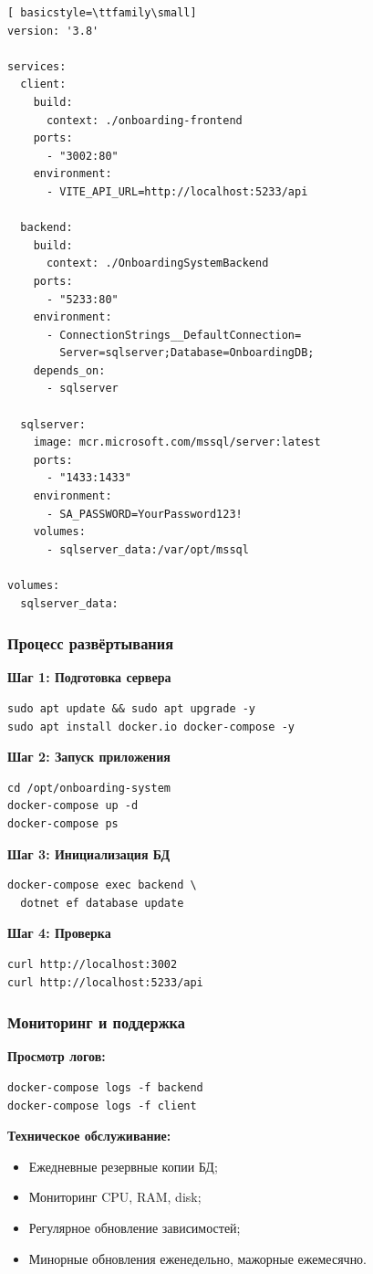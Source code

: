 \begin{lstlisting}[ basicstyle=\ttfamily\small]
version: '3.8'

services:
  client:
    build:
      context: ./onboarding-frontend
    ports:
      - "3002:80"
    environment:
      - VITE_API_URL=http://localhost:5233/api

  backend:
    build:
      context: ./OnboardingSystemBackend
    ports:
      - "5233:80"
    environment:
      - ConnectionStrings__DefaultConnection=
        Server=sqlserver;Database=OnboardingDB;
    depends_on:
      - sqlserver

  sqlserver:
    image: mcr.microsoft.com/mssql/server:latest
    ports:
      - "1433:1433"
    environment:
      - SA_PASSWORD=YourPassword123!
    volumes:
      - sqlserver_data:/var/opt/mssql

volumes:
  sqlserver_data:
\end{lstlisting}

\subsubsection{Процесс развёртывания}

\textbf{Шаг 1: Подготовка сервера}
\begin{lstlisting}[basicstyle=\ttfamily\small]
sudo apt update && sudo apt upgrade -y
sudo apt install docker.io docker-compose -y
\end{lstlisting}

\textbf{Шаг 2: Запуск приложения}
\begin{lstlisting}[basicstyle=\ttfamily\small]
cd /opt/onboarding-system
docker-compose up -d
docker-compose ps
\end{lstlisting}

\textbf{Шаг 3: Инициализация БД}
\begin{lstlisting}[basicstyle=\ttfamily\small]
docker-compose exec backend \
  dotnet ef database update
\end{lstlisting}

\textbf{Шаг 4: Проверка}
\begin{lstlisting}[basicstyle=\ttfamily\small]
curl http://localhost:3002
curl http://localhost:5233/api
\end{lstlisting}

\subsubsection{Мониторинг и поддержка}

\textbf{Просмотр логов:}
\begin{lstlisting}[basicstyle=\ttfamily\small]
docker-compose logs -f backend
docker-compose logs -f client
\end{lstlisting}

\textbf{Техническое обслуживание:}
\begin{itemize}
    \item Ежедневные резервные копии БД;
    \item Мониторинг CPU, RAM, disk;
    \item Регулярное обновление зависимостей;
    \item Минорные обновления еженедельно, мажорные ежемесячно.
\end{itemize}
